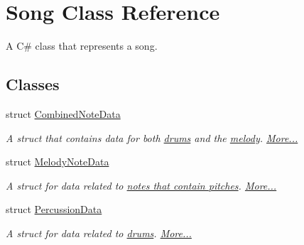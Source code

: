 \hypertarget{class_song}{}\section{Song Class Reference}
\label{class_song}


A C\# class that represents a song.  


\subsection*{Classes}
\begin{DoxyCompactItemize}
\item 
struct \hyperlink{group___song_structs_struct_song_1_1_combined_note_data}{Combined\+Note\+Data}
\begin{DoxyCompactList}\small\item\em A struct that contains data for both \hyperlink{group___music_structs_struct_music_1_1_percussion_note}{drums} and the \hyperlink{group___music_structs_struct_music_1_1_melody_note}{melody}.  \hyperlink{group___song_structs_struct_song_1_1_combined_note_data}{More...}\end{DoxyCompactList}\item 
struct \hyperlink{group___song_structs_struct_song_1_1_melody_note_data}{Melody\+Note\+Data}
\begin{DoxyCompactList}\small\item\em A struct for data related to \hyperlink{group___music_structs_struct_music_1_1_melody_note}{notes that contain pitches}.  \hyperlink{group___song_structs_struct_song_1_1_melody_note_data}{More...}\end{DoxyCompactList}\item 
struct \hyperlink{group___song_structs_struct_song_1_1_percussion_data}{Percussion\+Data}
\begin{DoxyCompactList}\small\item\em A struct for data related to \hyperlink{group___music_structs_struct_music_1_1_percussion_note}{drums}.  \hyperlink{group___song_structs_struct_song_1_1_percussion_data}{More...}\end{DoxyCompactList}\end{DoxyCompactItemize}
